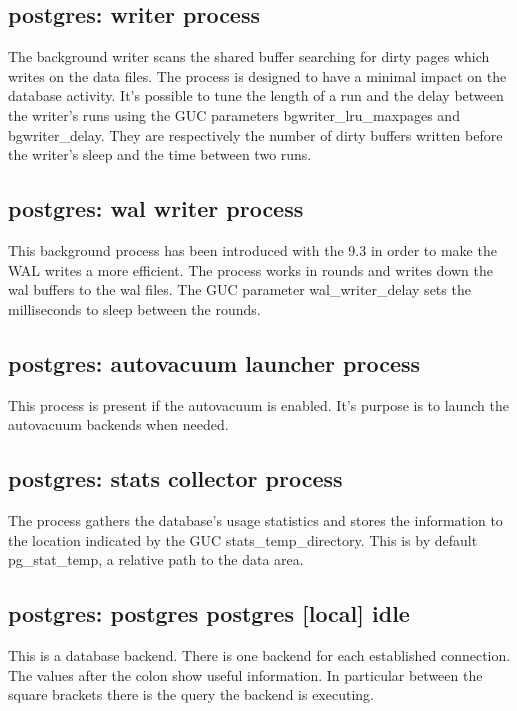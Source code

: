 \subsection{postgres: writer process}
The background writer scans the shared buffer searching for dirty pages which writes on the data
files. The process is designed to have a minimal impact on the database activity. It's possible to
tune the length of a run and the delay between the writer's runs using the GUC parameters
bgwriter\_lru\_maxpages and bgwriter\_delay.
They are respectively the number of dirty buffers written before the writer's sleep and the time
between two runs.

\subsection{postgres: wal writer process}
This background process has been introduced with the 9.3 in order to make the WAL writes a more
efficient. The process works in rounds and writes down the wal buffers to the  wal files. The GUC
parameter wal\_writer\_delay sets the milliseconds to sleep between the
rounds. 

\subsection{postgres: autovacuum launcher process}
This process is present if the autovacuum is enabled. It's purpose is to launch
the autovacuum backends when needed. 

\subsection{postgres: stats collector process}
The process gathers the database's usage statistics and stores the information to the location
indicated by the GUC stats\_temp\_directory. This is by default pg\_stat\_temp, a relative path to
the data area. 

\subsection{postgres: postgres postgres [local] idle}
This is a database backend. There is one backend for each established connection. The values after
the colon show useful information. In particular between the square brackets there is the query
the backend is executing. 

